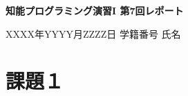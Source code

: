 \documentclass{jarticle}
\begin{document}

\begin{center} 
{\large \bf 知能プログラミング演習I 第7回レポート}
\end{center} %

\begin{flushright} 
XXXX年YYYY月ZZZZ日 %
\hskip 1mm
学籍番号 %
\hskip 1mm
氏名 %
\end{flushright} %

\renewcommand{\theenumi}{(\alph{enumi})}

\section*{課題１}
\end{document}
